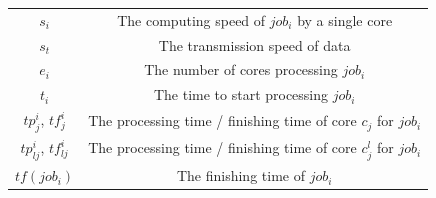 \documentclass{llncs}
\begin{document}
\begin{appendices}
\begin{table}[htbp]
\begin{center}
\begin{tabular}{c|c}
$s_i$ & The computing speed of $job_i$ by a single core\\
$s_t$ & The transmission speed of data \\
$e_i$ & The number of cores processing $job_i$\\
$t_i$ & The time to start processing $job_i$\\
$tp^i_j$, $tf^i_{j}$ & The processing time / finishing time of core $c_j$ for $job_i$\\
$tp^i_{lj}$, $tf^i_{lj}$ & The processing time / finishing time of core $c^l_j$ for $job_i$\\
$tf(job_i)$ & The finishing time of $job_i$ \\

\bottomrule
\end{tabular}
\label{tabSYMBOLS}
\end{center}
\end{table}

\end{appendices}





\end{document}
